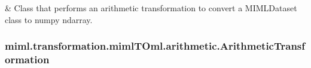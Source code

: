 \documentclass[letterpaper,10pt,english]{sphinxmanual}
\begin{document}
\begin{savenotes}\sphinxattablestart
\sphinxthistablewithglobalstyle
\sphinxthistablewithnovlinesstyle
\centering
\begin{tabulary}{\linewidth}[t]{}
\sphinxtoprule
\sphinxtableatstartofbodyhook
\sphinxAtStartPar
{\hyperref[\detokenize{transformation/mimlTOml/_autosummary/miml.transformation.mimlTOml.arithmetic.ArithmeticTransformation:miml.transformation.mimlTOml.arithmetic.ArithmeticTransformation}]{}}
&
\sphinxAtStartPar
Class that performs an arithmetic transformation to convert a MIMLDataset class to numpy ndarray.
\\
\sphinxbottomrule
\end{tabulary}
\sphinxtableafterendhook\par
\sphinxattableend\end{savenotes}

\sphinxstepscope


\subsubsection{miml.transformation.mimlTOml.arithmetic.ArithmeticTransformation}
\label{\detokenize{transformation/mimlTOml/_autosummary/miml.transformation.mimlTOml.arithmetic.ArithmeticTransformation:miml-transformation-mimltoml-arithmetic-arithmetictransformation}}\label{\detokenize{transformation/mimlTOml/_autosummary/miml.transformation.mimlTOml.arithmetic.ArithmeticTransformation::doc}}
\end{document}
